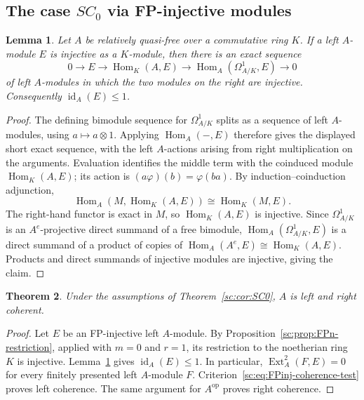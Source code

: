 \documentclass[11pt]{article}
\numberwithin{equation}{section}
\newtheorem{theorem}{Theorem}[section]
\newtheorem{lemma}[theorem]{Lemma}
\theoremstyle{definition}
\theoremstyle{remark}
\newcommand{\Ext}{\operatorname{Ext}}
\newcommand{\Hom}{\operatorname{Hom}}
\begin{document}
\subsection{The case \texorpdfstring{$SC_0$}{SC0} via FP-injective modules}

\begin{lemma}\label{sc:lem:coinduced-coresolution}
Let $A$ be relatively quasi-free over a commutative ring $K$.
If a left $A$-module $E$ is injective as a $K$-module, then there is an
exact sequence
\[
0\longrightarrow E\longrightarrow\Hom_K(A,E)
\longrightarrow\Hom_A(\Omega^1_{A/K},E)\longrightarrow0
\]
of left $A$-modules in which the two modules on the right are injective.
Consequently $\operatorname{id}_A(E)\le1$.
\end{lemma}
\begin{proof}
The defining bimodule sequence for $\Omega^1_{A/K}$ splits as a
sequence of left $A$-modules, using $a\mapsto a\otimes1$.
Applying $\Hom_A(-,E)$ therefore gives the displayed short exact
sequence, with the left $A$-actions arising from right multiplication on
the arguments.  Evaluation identifies the middle term with the
coinduced module $\Hom_K(A,E)$; its action is
$(a\varphi)(b)=\varphi(ba)$.  By induction--coinduction adjunction,
\[
\Hom_A(M,\Hom_K(A,E))\cong\Hom_K(M,E).
\]
The right-hand functor is exact in $M$, so $\Hom_K(A,E)$ is injective.
Since $\Omega^1_{A/K}$ is an $A^e$-projective direct summand of a free
bimodule, $\Hom_A(\Omega^1_{A/K},E)$ is a direct summand of a product of
copies of $\Hom_A(A^e,E)\cong\Hom_K(A,E)$.  Products and direct summands
of injective modules are injective, giving the claim.
\end{proof}

\begin{theorem}\label{sc:thm:FPinj-SC0}
Under the assumptions of Theorem~\ref{sc:cor:SC0}, $A$ is left and
right coherent.
\end{theorem}
\begin{proof}
Let $E$ be an FP-injective left $A$-module.  By
Proposition~\ref{sc:prop:FPn-restriction}, applied with
$m=0$ and $r=1$, its restriction to the noetherian ring $K$
is injective.  Lemma~\ref{sc:lem:coinduced-coresolution} gives
$\operatorname{id}_A(E)\le1$.  In particular,
$\Ext_A^2(F,E)=0$ for every finitely presented left $A$-module
$F$.  Criterion~\eqref{sc:eq:FPinj-coherence-test} proves left
coherence.  The same argument for $A^{\mathrm{op}}$ proves
right coherence.
\end{proof}
\end{document}
